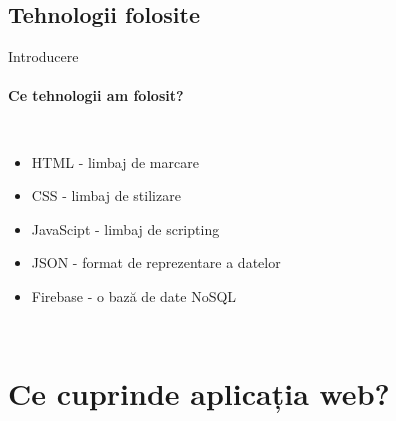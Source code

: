 \documentclass{beamer}
\begin{document}
\begin{darkframes}
		\subsection{Tehnologii folosite}
		\begin{frame}[label=lists]{Introducere}
			\framesubtitle{Ce tehnologii am folosit?}
			\begin{columns}[onlytextwidth]
				\begin{itemize}
					\item HTML - limbaj de marcare
					\item CSS - limbaj de stilizare
					\item JavaScipt - limbaj de scripting
					\item JSON - format de reprezentare a datelor
					\item Firebase - o bază de date NoSQL
				\end{itemize}
			\end{columns}
			
		\end{frame}
		
		
		\section{Ce cuprinde aplicația web?}
		

\end{darkframes}
\end{document}
